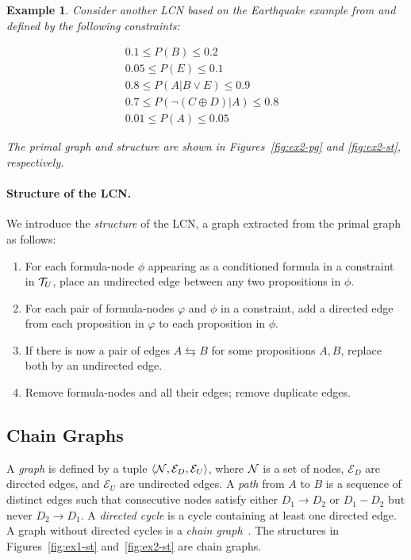 \documentclass{article}
\newtheorem{example}{Example}
\begin{document}
\begin{example}\label{ex:Earthquake}
   Consider another LCN based on the Earthquake example from \cite{cozman2024ijar} and defined by the following constraints:

\[
\begin{array}{ll}
0.1 \leq P(B) \leq 0.2 & \\
0.05 \leq P(E) \leq 0.1 & \\
0.8 \leq P(A|B \vee E) \leq 0.9 & \\
0.7 \leq P(\neg (C \oplus D) | A) \leq 0.8 & \\
0.01 \leq P(A) \leq 0.05 &
\end{array}
\]

    The primal graph and structure are shown in Figures~\ref{fig:ex2-pg} and \ref{fig:ex2-st}, respectively.
\end{example}


\paragraph{Structure of the LCN.} We introduce the \emph{structure} of the LCN, a graph extracted from the primal graph as follows:
\begin{enumerate}
    \item For each formula-node $\phi$ appearing as a conditioned formula in a constraint in $\mathcal{T}_U$, place an undirected edge between any two propositions in $\phi$.
    \item For each pair of formula-nodes $\varphi$ and $\phi$ in a constraint, add a directed edge from each proposition in $\varphi$ to each proposition in $\phi$.
    \item If there is now a pair of edges $A \leftrightarrows B$ for some propositions $A, B$, replace both by an undirected edge.
    \item Remove formula-nodes and all their edges; remove duplicate edges.
\end{enumerate}

\subsection{Chain Graphs}

A \emph{graph} is defined by a tuple $\langle \mathcal{N}, \mathcal{E}_D, \mathcal{E}_U \rangle$, where $\mathcal{N}$ is a set of nodes, $\mathcal{E}_D$ are directed edges, and $\mathcal{E}_U$ are undirected edges. A \emph{path} from $A$ to $B$ is a sequence of distinct edges such that consecutive nodes satisfy either $D_1 \rightarrow D_2$ or $D_1 - D_2$ but never $D_2 \rightarrow D_1$. A \emph{directed cycle} is a cycle containing at least one directed edge. A graph without directed cycles is a \emph{chain graph}~\cite{frydenberg1990chain,lauritzen1989graphical}. The structures in Figures~\ref{fig:ex1-st} and~\ref{fig:ex2-st} are chain graphs.
\end{document}
